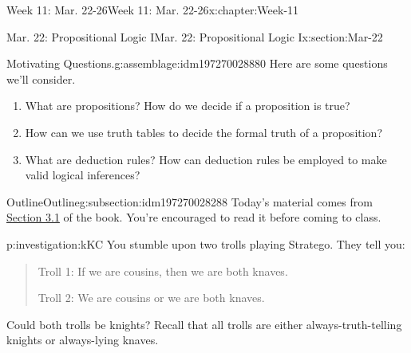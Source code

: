 \documentclass[oneside,10pt,]{book}
\numberwithin{equation}{section}
\begin{document}
%
%
\typeout{************************************************}
\typeout{************************************************}
%
\begin{chapterptx}{Week 11: Mar. 22-26}{}{Week 11: Mar. 22-26}{}{}{x:chapter:Week-11}
%
%
\typeout{************************************************}
\typeout{************************************************}
%
\begin{sectionptx}{Mar. 22: Propositional Logic I}{}{Mar. 22: Propositional Logic I}{}{}{x:section:Mar-22}
\begin{introduction}{}%
\begin{assemblage}{Motivating Questions.}{g:assemblage:idm197270028880}%
Here are some questions we'll consider. %
\begin{enumerate}
\item{}What are propositions? How do we decide if a proposition is true?%
\item{}How can we use truth tables to decide the formal truth of a proposition?%
\item{}What are deduction rules? How can deduction rules be employed to make valid logical inferences?%
\end{enumerate}
%
\end{assemblage}
\end{introduction}%
%
%
\typeout{************************************************}
\typeout{************************************************}
%
\begin{subsectionptx}{Outline}{}{Outline}{}{}{g:subsection:idm197270028288}
Today's material comes from \href{http://discrete.openmathbooks.org/dmoi3/sec_propositional.html}{Section 3.1} of the book. You're encouraged to read it before coming to class.%
\begin{investigation}{}{p:investigation:kKC}%
%
%
%
%
You stumble upon two trolls playing Stratego\textregistered{}. They tell you:%
\begin{quote}%
Troll 1: If we are cousins, then we are both knaves.%
\par
Troll 2: We are cousins or we are both knaves.%
\end{quote}
Could both trolls be knights? Recall that all trolls are either always-truth-telling knights or always-lying knaves.%
\end{investigation}%

\end{subsectionptx}
\end{sectionptx}
\end{chapterptx}
\end{document}
